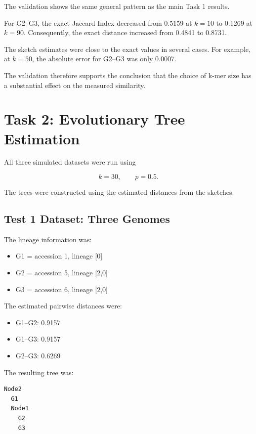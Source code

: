 \documentclass[11pt,a4paper]{article}
\begin{document}
The validation shows the same general pattern as the main Task 1 results.

For G2--G3, the exact Jaccard Index decreased from 0.5159 at $k=10$ to
0.1269 at $k=90$. Consequently, the exact distance increased from 0.4841
to 0.8731.

The sketch estimates were close to the exact values in several cases. For
example, at $k=50$, the absolute error for G2--G3 was only 0.0007.

The validation therefore supports the conclusion that the choice of k-mer size
has a substantial effect on the measured similarity.


\section{Task 2: Evolutionary Tree Estimation}

All three simulated datasets were run using

\[
k=30,\qquad p=0.5.
\]

The trees were constructed using the estimated distances from the sketches.

\subsection{Test 1 Dataset: Three Genomes}

The lineage information was:

\begin{itemize}
    \item G1 = accession 1, lineage [0]
    \item G2 = accession 5, lineage [2,0]
    \item G3 = accession 6, lineage [2,0]
\end{itemize}

The estimated pairwise distances were:

\begin{itemize}
    \item G1--G2: 0.9157
    \item G1--G3: 0.9157
    \item G2--G3: 0.6269
\end{itemize}

The resulting tree was:

\begin{lstlisting}
Node2
  G1
  Node1
    G2
    G3
\end{lstlisting}
\end{document}
